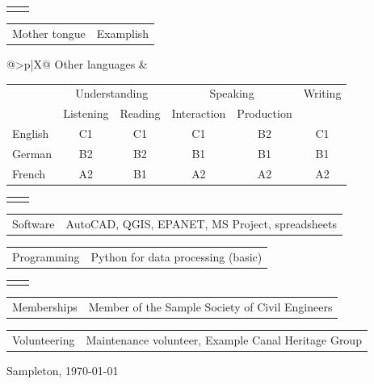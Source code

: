 \documentclass[10pt]{article}
\makeatletter
\newlength{\labelw}
\newcommand{\cvrow}[2]{%
  \begin{tabularx}{\textwidth}{@{}>{\raggedleft\arraybackslash\small\leavevmode\color{eublue}}p{\dimexpr\labelw-2\tabcolsep}|X@{}}
    #1 & #2
  \end{tabularx}\par\vspace{2pt}}
\newcommand{\cvsection}[1]{%
  \par\vspace{10pt}%
  \begin{tabularx}{\textwidth}{@{}>{\raggedleft\arraybackslash}p{\dimexpr\labelw-2\tabcolsep}X@{}}
    \leavevmode{\color{eublue}\small\bfseries\MakeUppercase{#1}} & \leavevmode{\color{eublue}\leaders\hrule height 3.2pt depth -2.4pt\hfill\mbox{}}
  \end{tabularx}\par\vspace{4pt}}
\makeatother
\begin{document}
\cvsection{Language skills}
\cvrow{Mother tongue}{Examplish}
\cvrow{Other languages}{%
  {\small
  \begin{tabular}[t]{@{}l c c c c c@{}}
    \toprule
     & \multicolumn{2}{c}{Understanding} & \multicolumn{2}{c}{Speaking} & Writing \\
     & Listening & Reading & Interaction & Production & \\
    \midrule
    English & C1 & C1 & C1 & B2 & C1 \\
    German & B2 & B2 & B1 & B1 & B1 \\
    French & A2 & B1 & A2 & A2 & A2 \\
    \bottomrule
  \end{tabular}}}

\cvsection{Digital skills}
\cvrow{Software}{AutoCAD, QGIS, EPANET, MS Project, spreadsheets}
\cvrow{Programming}{Python for data processing (basic)}

\cvsection{Other information}
\cvrow{Memberships}{Member of the Sample Society of Civil Engineers}
\cvrow{Volunteering}{Maintenance volunteer, Example Canal Heritage Group}

\vspace{1.5cm}
\hspace*{\labelw}\begin{minipage}{6cm}
  \par\vspace{4pt}
  Sampleton, \today
\end{minipage}
\end{document}
